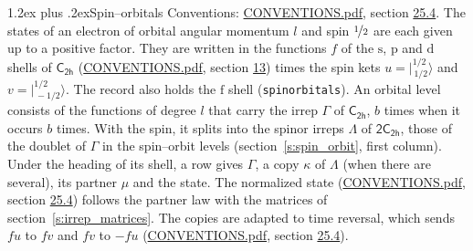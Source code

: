 \documentclass[10pt,a4paper]{article}
\makeatletter
\renewcommand\section{\@startsection{section}{1}{\z@}{-3ex plus -1ex minus -.2ex}%
  {1.2ex plus .2ex}{\normalfont\large\sffamily\bfseries\color{parttitle}}}
\numberwithin{equation}{section}
\newcommand{\grp}[1]{\mathsf{#1}}
\newcommand{\orbital}[1]{\mathrm{#1}}
\newcommand{\mult}{\kappa}
\newcommand{\intx}{\mu}
\newcommand{\jm}[2]{\bigl\lvert{}^{#1}_{\,#2}\bigr\rangle}
\makeatother
\begin{document}
\section{Spin--orbitals}\label{s:spin_orbitals}
Conventions: \href{../../CONVENTIONS.pdf}{CONVENTIONS.pdf}, section \href{../../CONVENTIONS.pdf\#conv.25.4}{25.4}.
\leavevmode\label{n:index.orbital.l}The states of an electron of orbital angular momentum $l$ and spin $\nicefrac{1}{2}$ are each given up to a positive factor. \label{n:local.spinor.uv}\label{n:local.function.f}They are written in the functions $f$ of the $\orbital{s}$, $\orbital{p}$ and $\orbital{d}$ shells of \href{../../../rotation/data/pdf/C2h.pdf}{$\grp{C_{2h}}$} (\href{../../CONVENTIONS.pdf}{CONVENTIONS.pdf}, section \href{../../../rotation/CONVENTIONS.pdf\#conv.13}{13}) times the spin kets $u = \jm{1/2}{1/2}$ and $v = \jm{1/2}{-1/2}$. The record also holds the $\orbital{f}$ shell (\texttt{spinorbitals}). An orbital level consists of the functions of degree $l$ that carry the irrep $\Gamma$ of \href{../../../rotation/data/pdf/C2h.pdf}{$\grp{C_{2h}}$}, $b$ times when it occurs $b$ times. With the spin, it splits into the spinor irreps $\Lambda$ of $\grp{2C_{2h}}$, those of the doublet of $\Gamma$ in the spin--orbit levels (section~\ref{s:spin_orbit}, first column). \label{n:head.state}Under the heading of its shell, a row gives $\Gamma$, a copy $\mult$ of $\Lambda$ (when there are several), its partner $\intx$ and the state. The normalized state (\href{../../CONVENTIONS.pdf}{CONVENTIONS.pdf}, section \href{../../CONVENTIONS.pdf\#conv.25.4}{25.4}) follows the partner law with the matrices of section~\ref{s:irrep_matrices}. The copies are adapted to time reversal, which sends $f u$ to $f v$ and $f v$ to $-f u$ (\href{../../CONVENTIONS.pdf}{CONVENTIONS.pdf}, section \href{../../CONVENTIONS.pdf\#conv.25.4}{25.4}).
\end{document}
